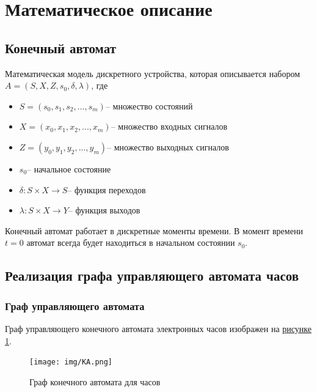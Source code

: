 \documentclass[10pt,a4paper,final]{article} %
\begin{document}
\newpage
\section{Математическое описание}
\subsection{Конечный автомат}
Математическая модель дискретного устройства, которая описывается набором $A = (S, X, Z, s_0, \delta, \lambda)$, где 
\begin{itemize}
	\item $S = (s_0, s_1, s_2, ... , s_m) \text{-- множество состояний}$
	\item $X = (x_0, x_1, x_2, ... , x_m) \text{-- множество входных сигналов}$
	\item $Z = (y_0, y_1, y_2, ... , y_m) \text{-- множество выходных сигналов}$
	\item $s_0 \text{-- начальное состояние} $
	\item $\delta: S \times X \rightarrow S \text{-- функция переходов}$
	\item  $\lambda: S \times X \rightarrow Y \text{-- функция выходов}$
\end{itemize}

Конечный автомат работает в дискретные моменты времени. В момент времени $t=0$ автомат всегда будет находиться в начальном состоянии $s_0$.

\subsection{Реализация графа управляющего автомата часов}
\subsubsection{Граф управляющего автомата}
Граф управляющего конечного автомата электронных часов изображен на  \hyperref[КА]{рисунке 1}.
\newpage
\begin{figure}[htpb]
	\centering
	\texttt{[image: img/КА.png]}
	\label{КА} 
	\caption{Граф конечного автомата для часов}
\end{figure}
\end{document}
